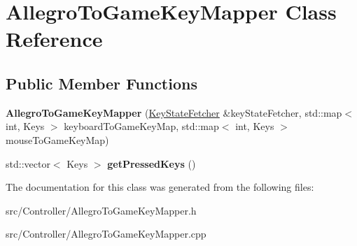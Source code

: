 \hypertarget{classAllegroToGameKeyMapper}{}\section{Allegro\+To\+Game\+Key\+Mapper Class Reference}
\label{classAllegroToGameKeyMapper}
\subsection*{Public Member Functions}
\begin{DoxyCompactItemize}
\item 
{\bfseries Allegro\+To\+Game\+Key\+Mapper} (\hyperlink{classKeyStateFetcher}{Key\+State\+Fetcher} \&key\+State\+Fetcher, std\+::map$<$ int, Keys $>$ keyboard\+To\+Game\+Key\+Map, std\+::map$<$ int, Keys $>$ mouse\+To\+Game\+Key\+Map)\hypertarget{classAllegroToGameKeyMapper_a8d316653102f98411984ab2b4b4c6f70}{}\label{classAllegroToGameKeyMapper_a8d316653102f98411984ab2b4b4c6f70}

\item 
std\+::vector$<$ Keys $>$ {\bfseries get\+Pressed\+Keys} ()\hypertarget{classAllegroToGameKeyMapper_a88d81b6ac9b28fbc8df7ea0b3de1e3f2}{}\label{classAllegroToGameKeyMapper_a88d81b6ac9b28fbc8df7ea0b3de1e3f2}

\end{DoxyCompactItemize}


The documentation for this class was generated from the following files\+:\begin{DoxyCompactItemize}
\item 
src/\+Controller/Allegro\+To\+Game\+Key\+Mapper.\+h\item 
src/\+Controller/Allegro\+To\+Game\+Key\+Mapper.\+cpp\end{DoxyCompactItemize}

